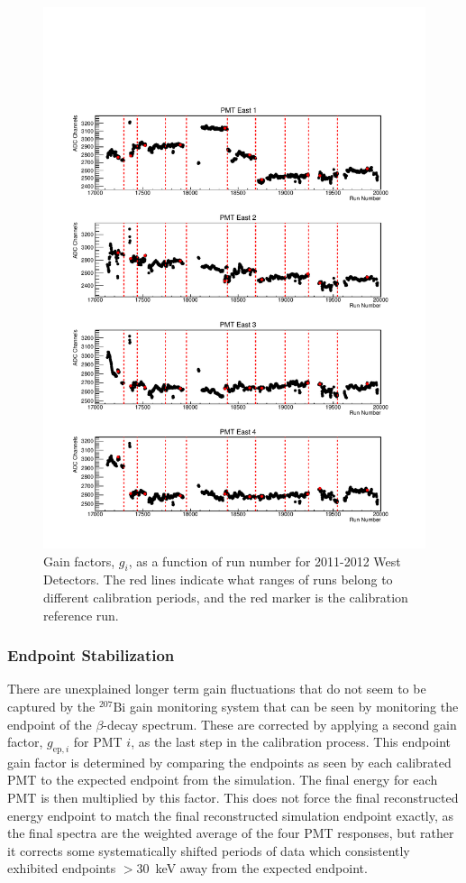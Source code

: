 \begin{figure}[p] 
  \centering
  \includegraphics[page=4,scale=.8]{3-UCNAAnalysis/2011-2012_gain.pdf}
  \caption{Gain factors, $g_i$, as a function of run number for 2011-2012 West Detectors.
    The red lines indicate what ranges of runs belong to
    different calibration periods, and the red marker is the calibration reference run.}
  \label{fig:2011-2012pulser_West}
\end{figure}

\subsubsection{Endpoint Stabilization} \label{sssec:endpoint}

There are unexplained longer term gain fluctuations that do not seem to be captured by the
$^{207}\mathrm{Bi}$ gain monitoring system that can be seen by monitoring the endpoint of the
$\beta$-decay spectrum. These are corrected by applying a second gain factor, $g_{\mathrm{ep},i}$ for PMT $i$,
as the last step in the calibration process. This endpoint gain factor is determined
by comparing the endpoints as seen by each
calibrated PMT to the expected endpoint from the simulation. The final energy for each PMT
is then multiplied by this factor. This does not force the final reconstructed energy endpoint to
match the final reconstructed simulation endpoint exactly,
as the final spectra are the weighted average of the four PMT responses, but rather it corrects 
some systematically shifted periods of data which consistently exhibited endpoints $>30$~keV
away from the expected endpoint.

